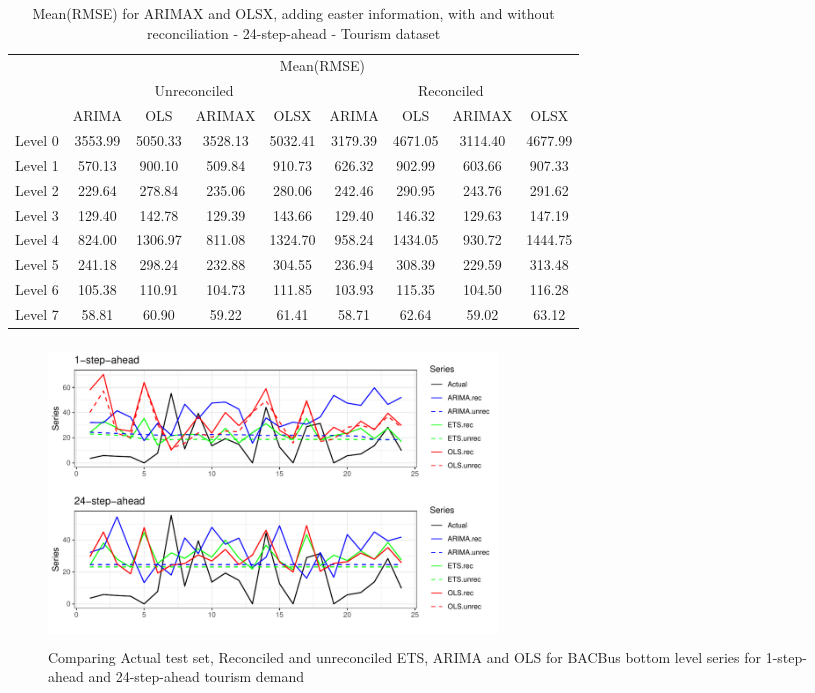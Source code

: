 \documentclass[11pt,a4paper,]{article}
\begin{document}
\begin{table}[t]

\caption{\label{tab:easterRMSE}Mean(RMSE) for ARIMAX and OLSX, adding easter information, with and without reconciliation - 24-step-ahead - Tourism dataset}
\centering
\begin{tabular}{ccccccccc}
\toprule
\multicolumn{1}{c}{} & \multicolumn{8}{c}{Mean(RMSE)} \\
\cmidrule(l{3pt}r{3pt}){2-9}
\multicolumn{1}{c}{} & \multicolumn{4}{c}{Unreconciled} & \multicolumn{4}{c}{Reconciled} \\
\cmidrule(l{3pt}r{3pt}){2-5} \cmidrule(l{3pt}r{3pt}){6-9}
 & ARIMA & OLS & ARIMAX & OLSX & ARIMA & OLS & ARIMAX & OLSX\\
\midrule
Level 0 & 3553.99 & 5050.33 & 3528.13 & 5032.41 & 3179.39 & 4671.05 & 3114.40 & 4677.99\\
Level 1 & 570.13 & 900.10 & 509.84 & 910.73 & 626.32 & 902.99 & 603.66 & 907.33\\
Level 2 & 229.64 & 278.84 & 235.06 & 280.06 & 242.46 & 290.95 & 243.76 & 291.62\\
Level 3 & 129.40 & 142.78 & 129.39 & 143.66 & 129.40 & 146.32 & 129.63 & 147.19\\
Level 4 & 824.00 & 1306.97 & 811.08 & 1324.70 & 958.24 & 1434.05 & 930.72 & 1444.75\\
Level 5 & 241.18 & 298.24 & 232.88 & 304.55 & 236.94 & 308.39 & 229.59 & 313.48\\
Level 6 & 105.38 & 110.91 & 104.73 & 111.85 & 103.93 & 115.35 & 104.50 & 116.28\\
Level 7 & 58.81 & 60.90 & 59.22 & 61.41 & 58.71 & 62.64 & 59.02 & 63.12\\
\bottomrule
\end{tabular}
\end{table}

\begin{figure}

{\centering \includegraphics[width=450px,height=300px]{hcf_files/figure-latex/forecstrolling24tourism-1} 

}

\caption{Comparing Actual test set, Reconciled and unreconciled ETS, ARIMA and OLS for BACBus bottom level series for 1-step-ahead and 24-step-ahead tourism demand}\label{fig:forecstrolling24tourism}
\end{figure}
\end{document}
